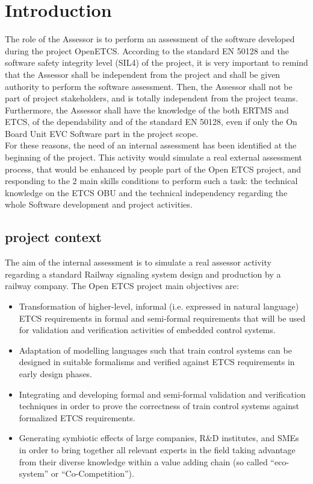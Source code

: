 \documentclass{template/openetcs_article}
\begin{document}

\section{Introduction}
The role of the Assessor is to perform an assessment of the software developed during the project OpenETCS. According to the standard EN 50128 and the software safety integrity level (SIL4) of the project, it is very important to remind that the Assessor shall be independent from the project and shall be given authority to perform the software assessment. Then, the Assessor shall not be part of project stakeholders, and is totally independent from the project teams. Furthermore, the Assessor shall have the knowledge of the both ERTMS and ETCS, of the dependability and of the standard EN 50128, even if only the On Board Unit EVC Software part in the project scope.
\\
For these reasons, the need of an internal assessment has been identified at the beginning of the project. This activity would simulate a real external assessment process, that would be  enhanced by people part of the Open ETCS project, and responding to the 2 main skills conditions to perform such a task: the technical knowledge on the ETCS OBU and the technical independency regarding the whole Software development and project activities. 

\subsection{project context}
The aim of the internal assessment is to simulate a real assessor activity regarding a standard Railway signaling system design and production by a railway company. The Open ETCS project main objectives are:
\begin{itemize}
\item Transformation of higher-level, informal (i.e. expressed in natural language) ETCS requirements in formal and semi-formal requirements that will be used for validation and verification activities of embedded control systems.
\item Adaptation of modelling languages such that train control systems can be designed in suitable formalisms and verified against ETCS requirements in early design phases.
\item Integrating and developing formal and semi-formal validation and verification techniques in order to prove the correctness of train control systems against formalized ETCS requirements.
\item Generating symbiotic effects of large companies, R\&D institutes, and SMEs in order to bring together all relevant experts in the field taking advantage from their diverse knowledge within a value adding chain (so called “eco-system” or “Co-Competition”).
\end{itemize}
\end{document}
